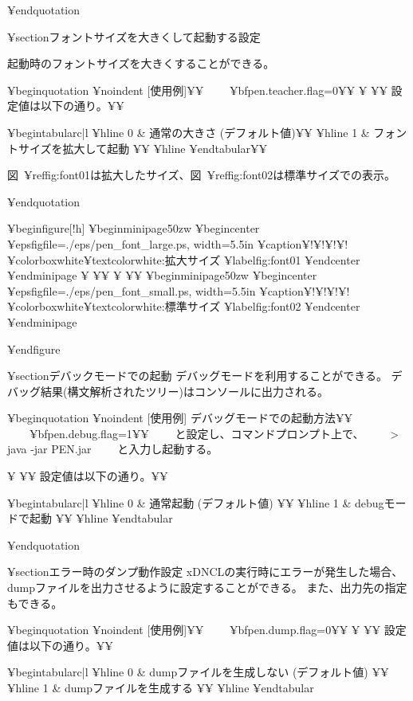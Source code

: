 ¥end{quotation}

¥section{フォントサイズを大きくして起動する設定}

起動時のフォントサイズを大きくすることができる。

¥begin{quotation}
¥noindent [使用例]¥¥
~~~~{¥bf{pen.teacher.flag=0}}¥¥
¥ ¥¥
設定値は以下の通り。¥¥

¥begin{tabular}{c|l}
¥hline
0 & 通常の大きさ (デフォルト値)¥¥
¥hline
1 & フォントサイズを拡大して起動 ¥¥
¥hline
¥end{tabular}¥¥


図~¥ref{fig:font01}は拡大したサイズ、図~¥ref{fig:font02}は標準サイズでの表示。

¥end{quotation}

¥begin{figure}[!h]
¥begin{minipage}{50zw}
¥begin{center}
¥epsfig{file=./eps/pen_font_large.ps, width=5.5in}
¥caption{$¥!¥!¥!¥!$¥colorbox{white}{{¥textcolor{white}{:}}}拡大サイズ }
¥label{fig:font01}
¥end{center}
¥end{minipage}
¥ ¥¥
¥ ¥¥
¥begin{minipage}{50zw}
¥begin{center}
¥epsfig{file=./eps/pen_font_small.ps, width=5.5in}
¥caption{$¥!¥!¥!¥!$¥colorbox{white}{{¥textcolor{white}{:}}}標準サイズ}
¥label{fig:font02}
¥end{center}
¥end{minipage}

¥end{figure}


¥section{デバックモードでの起動}
デバッグモードを利用することができる。
デバッグ結果(構文解析されたツリー)はコンソールに出力される。

¥begin{quotation}
¥noindent [使用例] デバッグモードでの起動方法¥¥
~~~~{¥bf{pen.debug.flag=1}}¥¥
~~~~と設定し、コマンドプロンプト上で、
~~~~> java -jar PEN.jar
~~~~と入力し起動する。

¥ ¥¥
設定値は以下の通り。¥¥

¥begin{tabular}{c|l}
¥hline
0 & 通常起動 (デフォルト値) ¥¥
¥hline
1 & debugモードで起動 ¥¥
¥hline
¥end{tabular}


¥end{quotation}

¥section{エラー時のダンプ動作設定}
xDNCLの実行時にエラーが発生した場合、
dumpファイルを出力させるように設定することができる。
また、出力先の指定もできる。

¥begin{quotation}
¥noindent [使用例]¥¥
~~~~{¥bf{pen.dump.flag=0}}¥¥
¥ ¥¥
設定値は以下の通り。¥¥

¥begin{tabular}{c|l}
¥hline
0 & dumpファイルを生成しない (デフォルト値) ¥¥
¥hline
1 & dumpファイルを生成する ¥¥
¥hline
¥end{tabular}

